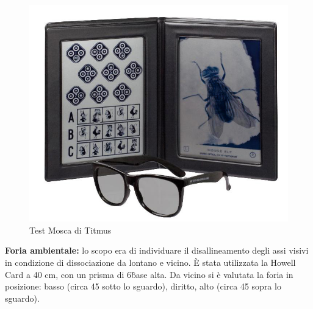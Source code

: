 \begin{figure}[h!]
	\centering
	\includegraphics[scale=0.22]{source/immagini/titmus.jpg}
	\caption[Semantic Web stack]{Test Mosca di Titmus}
	\label{fig:issuexample}
\end{figure}

\textbf{Foria ambientale:} lo scopo era di individuare il disallineamento degli assi visivi in condizione di dissociazione da
lontano e vicino. È stata utilizzata la Howell Card a 40 cm, con un prisma di 6\^ base alta. Da vicino si è valutata la foria
in posizione: basso (circa 45\° sotto lo sguardo), diritto, alto (circa 45\° sopra lo sguardo).

